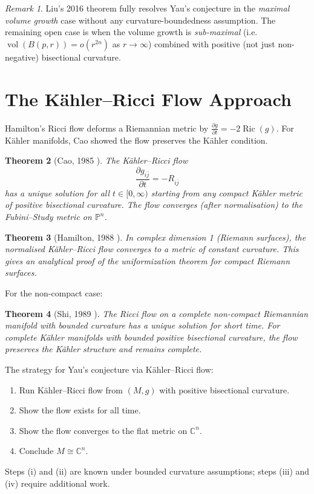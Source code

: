 \documentclass[12pt,a4paper]{amsart}
\newtheorem{theorem}{Theorem}[section]
\theoremstyle{definition}
\theoremstyle{remark}
\newtheorem{remark}[theorem]{Remark}
\DeclareMathOperator{\Ric}{Ric}
\DeclareMathOperator{\vol}{vol}
\newcommand{\CC}{\mathbb{C}}
\newcommand{\PP}{\mathbb{P}}
\begin{document}
\begin{remark}
Liu's 2016 theorem \cite{GangLiu2016} fully resolves Yau's conjecture
in the \emph{maximal volume growth} case without any curvature-boundedness
assumption.  The remaining open case is when the volume growth is
\emph{sub-maximal} (i.e.\ $\vol(B(p,r)) = o(r^{2n})$ as $r \to \infty$)
combined with positive (not just non-negative) bisectional curvature.
\end{remark}

\section{The Kähler--Ricci Flow Approach}

Hamilton's Ricci flow \cite{Hamilton1982} deforms a Riemannian metric by
$\frac{\partial g}{\partial t} = -2\Ric(g)$.  For Kähler manifolds,
Cao \cite{Cao1985} showed the flow preserves the Kähler condition.

\begin{theorem}[Cao, 1985 \cite{Cao1985}]
The Kähler--Ricci flow
\[
  \frac{\partial g_{i\bar{j}}}{\partial t} = -R_{i\bar{j}}
\]
has a unique solution for all $t \in [0,\infty)$ starting from any compact
Kähler metric of positive bisectional curvature.  The flow converges (after
normalisation) to the Fubini--Study metric on $\PP^n$.
\end{theorem}

\begin{theorem}[Hamilton, 1988 \cite{Hamilton1988}]
In complex dimension 1 (Riemann surfaces), the normalised Kähler--Ricci flow
converges to a metric of constant curvature.  This gives an analytical proof
of the uniformization theorem for compact Riemann surfaces.
\end{theorem}

For the non-compact case:

\begin{theorem}[Shi, 1989 \cite{Shi1989}]
The Ricci flow on a complete non-compact Riemannian manifold with bounded
curvature has a unique solution for short time.  For complete Kähler manifolds
with bounded positive bisectional curvature, the flow preserves the Kähler
structure and remains complete.
\end{theorem}

The strategy for Yau's conjecture via Kähler--Ricci flow:
\begin{enumerate}[label=(\roman*)]
  \item Run Kähler--Ricci flow from $(M,g)$ with positive bisectional curvature.
  \item Show the flow exists for all time.
  \item Show the flow converges to the flat metric on $\CC^n$.
  \item Conclude $M \cong \CC^n$.
\end{enumerate}
Steps (i) and (ii) are known under bounded curvature assumptions;
steps (iii) and (iv) require additional work.
\end{document}
